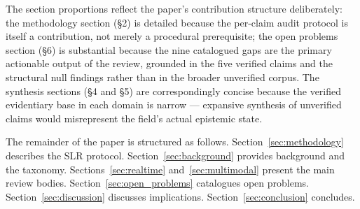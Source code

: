 The section proportions reflect the paper's contribution structure deliberately: the methodology section (§2) is detailed because the per-claim audit protocol is itself a contribution, not merely a procedural prerequisite; the open problems section (§6) is substantial because the nine catalogued gaps are the primary actionable output of the review, grounded in the five verified claims and the structural null findings rather than in the broader unverified corpus.
The synthesis sections (§4 and §5) are correspondingly concise because the verified evidentiary base in each domain is narrow — expansive synthesis of unverified claims would misrepresent the field's actual epistemic state.

The remainder of the paper is structured as follows.
Section~\ref{sec:methodology} describes the SLR protocol.
Section~\ref{sec:background} provides background and the taxonomy.
Sections~\ref{sec:realtime} and~\ref{sec:multimodal} present the main review bodies.
Section~\ref{sec:open_problems} catalogues open problems.
Section~\ref{sec:discussion} discusses implications.
Section~\ref{sec:conclusion} concludes.
